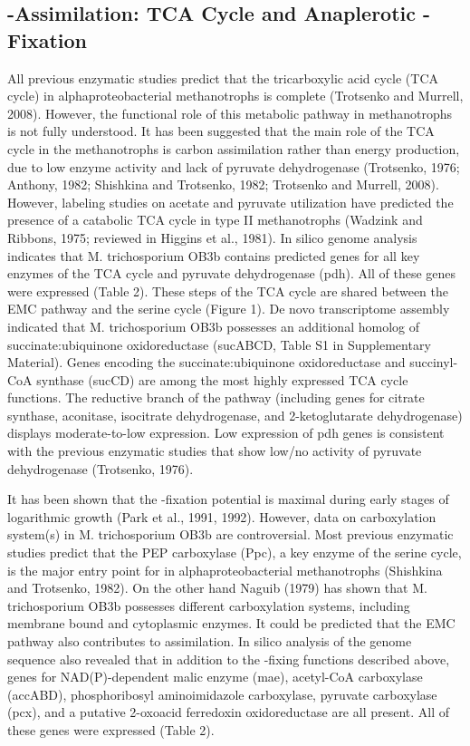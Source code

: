\subsection{-Assimilation: TCA Cycle and Anaplerotic -Fixation}
All previous enzymatic studies predict that the tricarboxylic acid cycle (TCA cycle) in alphaproteobacterial methanotrophs is complete (Trotsenko and Murrell, 2008).
However, the functional role of this metabolic pathway in methanotrophs is not fully understood.
It has been suggested that the main role of the TCA cycle in the methanotrophs is carbon assimilation rather than energy production, due to low enzyme activity and lack of pyruvate dehydrogenase (Trotsenko, 1976; Anthony, 1982; Shishkina and Trotsenko, 1982; Trotsenko and Murrell, 2008).
However, labeling studies on acetate and pyruvate utilization have predicted the presence of a catabolic TCA cycle in type II methanotrophs (Wadzink and Ribbons, 1975; reviewed in Higgins et al., 1981).
In silico genome analysis indicates that M. trichosporium OB3b contains predicted genes for all key enzymes of the TCA cycle and pyruvate dehydrogenase (pdh).
All of these genes were expressed (Table 2).
These steps of the TCA cycle are shared between the EMC pathway and the serine cycle (Figure 1).
De novo transcriptome assembly indicated that M. trichosporium OB3b possesses an additional homolog of succinate:ubiquinone oxidoreductase (sucABCD, Table S1 in Supplementary Material).
Genes encoding the succinate:ubiquinone oxidoreductase and succinyl-CoA synthase (sucCD) are among the most highly expressed TCA cycle functions.
The reductive branch of the pathway (including genes for citrate synthase, aconitase, isocitrate dehydrogenase, and 2-ketoglutarate dehydrogenase) displays moderate-to-low expression.
Low expression of pdh genes is consistent with the previous enzymatic studies that show low/no activity of pyruvate dehydrogenase (Trotsenko, 1976).

It has been shown that the -fixation potential is maximal during early stages of logarithmic growth (Park et al., 1991, 1992).
However, data on carboxylation system(s) in M. trichosporium OB3b are controversial.
Most previous enzymatic studies predict that the PEP carboxylase (Ppc), a key enzyme of the serine cycle, is the major entry point for  in alphaproteobacterial methanotrophs (Shishkina and Trotsenko, 1982).
On the other hand Naguib (1979) has shown that M. trichosporium OB3b possesses different carboxylation systems, including membrane bound and cytoplasmic enzymes.
It could be predicted that the EMC pathway also contributes to  assimilation.
In silico analysis of the genome sequence also revealed that in addition to the -fixing functions described above, genes for NAD(P)-dependent malic enzyme (mae), acetyl-CoA carboxylase (accABD), phosphoribosyl aminoimidazole carboxylase, pyruvate carboxylase (pcx), and a putative 2-oxoacid ferredoxin oxidoreductase are all present.
All of these genes were expressed (Table 2).

